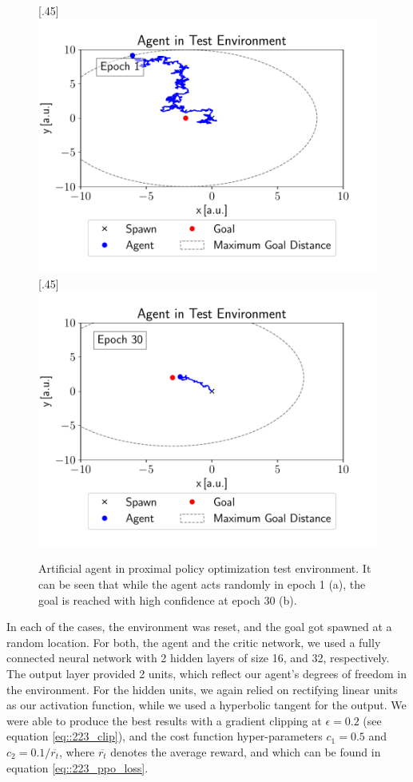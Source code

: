 \begin{figure}[h!]
	\centering
	[.45\linewidth]{\includegraphics[scale=.45]{chapters/04_experiments/02_autonomous_walking/epoch_1.pdf}}	
	[.45\linewidth]{\includegraphics[scale=.45]{chapters/04_experiments/02_autonomous_walking/epoch_30.pdf}}
	\caption{Artificial agent in proximal policy optimization test environment. It can be seen that while the agent acts randomly in epoch 1 (a), the goal is reached with high confidence at epoch 30 (b).}	
	\label{fig::425_ppo_env}
\end{figure} 
In each of the cases, the environment was reset, and the goal got spawned at a random location. For both, the agent and the critic network, we used a fully connected neural network with 2 hidden layers of size 16, and 32, respectively. The output layer provided 2 units, which reflect our agent's degrees of freedom in the environment. For the hidden units, we again relied on rectifying linear units as our activation function, while we used a hyperbolic tangent for the output. We were able to produce the best results with a gradient clipping at $\epsilon=0.2$ (see equation \ref{eq::223_clip}), and the cost function hyper-parameters $c_1 = 0.5$ and $c_2 = 0.1/\overline{r_t}$, where $\overline{r_t}$ denotes the average reward, and which can be found in equation \ref{eq::223_ppo_loss}. 
